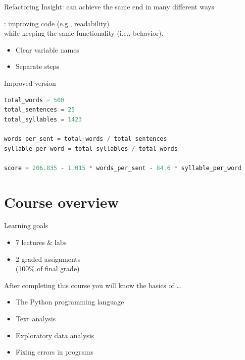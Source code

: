 \documentclass[aspectratio=169,usenames,dvipsnames]{beamer}
\begin{document}
\begin{frame}{Refactoring}
	Insight: can achieve the same end in many different ways

	\pause
	\begin{definition}
		: improving code (e.g., readability) \\
			while keeping the same functionality (i.e., behavior).
	\end{definition}

	\begin{itemize}
		\item Clear variable names
		\item Separate steps
	\end{itemize}
\end{frame}


\begin{frame}[fragile]{Improved version}
\begin{lstlisting}[language=python]
total_words = 500
total_sentences = 25
total_syllables = 1423

words_per_sent = total_words / total_sentences
syllable_per_word = total_syllables / total_words

score = 206.835 - 1.015 * words_per_sent - 84.6 * syllable_per_word
\end{lstlisting}
\end{frame}



\section{Course overview}
\frame{\tableofcontents[currentsection]}

\begin{frame}{Learning goals}
    \begin{itemize}
       \item 7 lectures \& labs
       \item 2 graded assignments \\
           (100\% of final grade)
    \end{itemize}
    After completing this course you will know the basics of \dots
    \begin{itemize}
       \item The Python programming language
       \item Text analysis
       \item Exploratory data analysis
       \item Fixing errors in programs
    \end{itemize}
\end{frame}
\end{document}
